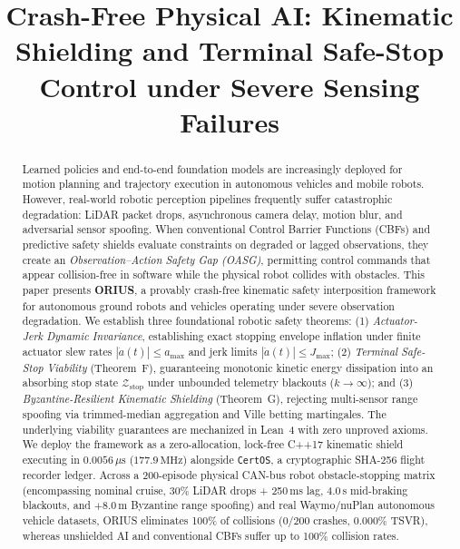 \documentclass[conference]{IEEEtran}
\begin{document}
\title{Crash-Free Physical AI: Kinematic Shielding and Terminal Safe-Stop Control under Severe Sensing Failures}

\author{
}

\maketitle

\begin{abstract}
Learned policies and end-to-end foundation models are increasingly deployed for motion planning and trajectory execution in autonomous vehicles and mobile robots. However, real-world robotic perception pipelines frequently suffer catastrophic degradation: LiDAR packet drops, asynchronous camera delay, motion blur, and adversarial sensor spoofing. When conventional Control Barrier Functions (CBFs) and predictive safety shields evaluate constraints on degraded or lagged observations, they create an \emph{Observation--Action Safety Gap (OASG)}, permitting control commands that appear collision-free in software while the physical robot collides with obstacles.
This paper presents \textbf{ORIUS}, a provably crash-free kinematic safety interposition framework for autonomous ground robots and vehicles operating under severe observation degradation. We establish three foundational robotic safety theorems: (1) \emph{Actuator-Jerk Dynamic Invariance}, establishing exact stopping envelope inflation under finite actuator slew rates $|\dot{a}(t)| \le a_{\max}$ and jerk limits $|\ddot{a}(t)| \le J_{\max}$; (2) \emph{Terminal Safe-Stop Viability} (Theorem~F), guaranteeing monotonic kinetic energy dissipation into an absorbing stop state $\mathcal{Z}_{\mathrm{stop}}$ under unbounded telemetry blackouts ($k \to \infty$); and (3) \emph{Byzantine-Resilient Kinematic Shielding} (Theorem~G), rejecting multi-sensor range spoofing via trimmed-median aggregation and Ville betting martingales.
The underlying viability guarantees are mechanized in Lean~4 with zero unproved axioms. We deploy the framework as a zero-allocation, lock-free C++17 kinematic shield executing in $0.0056\,\mu\text{s}$ ($177.9\,\text{MHz}$) alongside \texttt{CertOS}, a cryptographic SHA-256 flight recorder ledger. Across a 200-episode physical CAN-bus robot obstacle-stopping matrix (encompassing nominal cruise, 30\% LiDAR drops + 250\,ms lag, 4.0\,s mid-braking blackouts, and $+8.0\,\text{m}$ Byzantine range spoofing) and real Waymo/nuPlan autonomous vehicle datasets, ORIUS eliminates 100\% of collisions ($0/200$ crashes, $0.000\%$ TSVR), whereas unshielded AI and conventional CBFs suffer up to 100\% collision rates.
\end{abstract}
\end{document}
